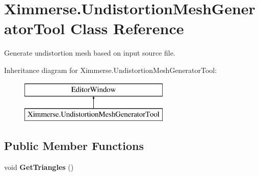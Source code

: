 \hypertarget{class_ximmerse_1_1_undistortion_mesh_generator_tool}{}\section{Ximmerse.\+Undistortion\+Mesh\+Generator\+Tool Class Reference}
\label{class_ximmerse_1_1_undistortion_mesh_generator_tool}


Generate undistortion mesh based on input source file.  


Inheritance diagram for Ximmerse.\+Undistortion\+Mesh\+Generator\+Tool\+:\begin{figure}[H]
\begin{center}
\leavevmode
\includegraphics[height=2.000000cm]{class_ximmerse_1_1_undistortion_mesh_generator_tool}
\end{center}
\end{figure}
\subsection*{Public Member Functions}
\begin{DoxyCompactItemize}
\item 
\mbox{\label{class_ximmerse_1_1_undistortion_mesh_generator_tool_a3b7525b1d259f51e950433675a5e572d}} 
void {\bfseries Get\+Triangles} ()
\end{DoxyCompactItemize}
